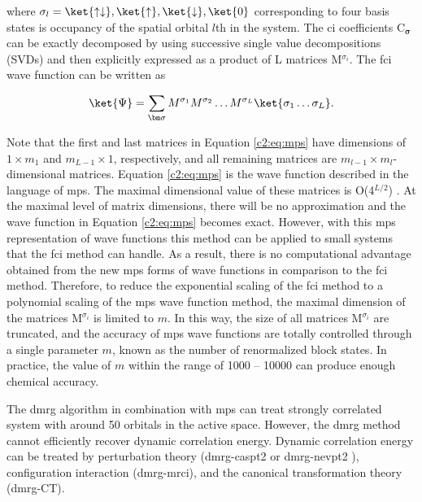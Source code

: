 \begin{refsection}
\noindent where $\sigma_l = \ket{\uparrow\downarrow}, \ket{\uparrow}, \ket{\downarrow}, \ket{0} $ corresponding to four basis states is occupancy of the spatial orbital $l$th in the system. The \acrshort{ci} coefficients C$_{\bm{\sigma}}$ can be exactly decomposed by using successive single value decompositions (SVDs) and then explicitly expressed as a product of L matrices M$^{{\sigma}_i}$. The \acrshort{fci} wave function can be written as


\begin{equation}
	\label{c2:eq:mps}
	\ket{\Psi} = \sum_{\bm\sigma} M^{{\sigma}_1} M^{{\sigma}_2}\dots M^{{\sigma}_L} \ket{\sigma_1\dots\sigma_L}.
\end{equation}


\noindent Note that the first and last matrices in Equation \ref{c2:eq:mps} have dimensions of $1 \times m_1$ and $m_{L-1} \times 1$, respectively, and all remaining matrices are $m_{l-1} \times m_l$-dimensional matrices. Equation \ref{c2:eq:mps} is the wave function described in the language of \acrshort{mps}. The maximal dimensional value of these matrices is O(4$^{L/2}$) \cite{dmrg8, dmrg9}. At the maximal level of matrix dimensions, there will be no approximation and the wave function in Equation \ref{c2:eq:mps} becomes exact. However, with this \acrshort{mps} representation of wave functions this method can be applied to small systems that the \acrshort{fci} method can handle. \cite{dmrg11} As a result, there is no computational advantage obtained from the new \acrshort{mps} forms of wave functions in comparison to the \acrshort{fci} method. Therefore, to reduce the exponential scaling of the \acrshort{fci} method to a polynomial scaling of the \acrshort{mps} wave function method, the maximal dimension of the matrices M$^{\sigma_i}$ is limited to $m$. \cite{dmrg10} In this way, the size of all matrices M$^{\sigma_i}$ are truncated, and the accuracy of \acrshort{mps} wave functions are totally controlled through a single parameter $m$, known as the number of renormalized block states. In practice, the value of $m$ within the range of 1000 -- 10000 can produce enough chemical accuracy. \cite{dmrg12} 


 
The \acrshort{dmrg} algorithm in combination with \acrshort{mps} can treat strongly correlated system with around 50 orbitals in the active space. However, the \acrshort{dmrg} method cannot efficiently recover dynamic correlation energy. Dynamic correlation energy can be treated by perturbation theory (\acrshort{dmrg}-\acrshort{caspt2} \cite{dmrgcaspt2, dmrgcaspt2c} or \acrshort{dmrg}-\acrshort{nevpt2} \cite{dmrgnevpt2, dmrgnevpt22}), configuration interaction (\acrshort{dmrg}-\acrshort{mrci}), and  the canonical transformation theory (\acrshort{dmrg}-CT). \cite{dmrg16, dmrg17} 









\end{refsection}
